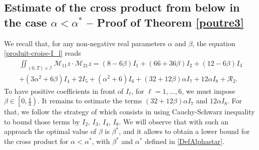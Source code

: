 \documentclass[a4paper, 12pt]{article}
\theoremstyle{plain}
\theoremstyle{definition}
\numberwithin{theorem}{section}
\numberwithin{equation}{section}
\begin{document}
{\subsection{Estimate of the cross product from below in the case \texorpdfstring{$\alpha<\alpha^*$}{etoilealpha} -- Proof of Theorem \ref{poutre3}} 
We recall that,  for any non-negative real parameters $\alpha$ and $\beta$, the equation \eqref{produit-croise-I_l} reads
\begin{multline*}
\iint_{(0,T)\times\mathcal{I}}\mathcal{M}_{11} z\cdot \mathcal{M}_{21} z=(8-6\beta)I_1+(66+36\beta) I_2+(12-6\beta) I_3\\
+(3\alpha^2+6\beta) I_4+2 I_5+(\alpha^2+6)I_6+(32+12\beta)\alpha I_7+ 12 \alpha I_8+\mathcal{R}_2.
\end{multline*}
To have positive coefficients in front of $I_\ell$, for $\ell=1,\ldots ,6$, we must impose $\beta\in \left[0,\frac{4}{3}\right)$. 
It remains to estimate the terms $(32+12\beta)\alpha I_7$ and $ 12 \alpha I_8$. For that, we follow the strategy of \cite{Sourav} which consists in using Cauchy-Schwarz inequality to bound those terms by $I_2$, $I_3$, $I_4$, $I_8$. We will observe that with such an approach the optimal value of $\beta$ is $\beta^*$, and it allows to obtain a lower bound for the cross product for $\alpha<\alpha^*$, with $\beta^*$ and $\alpha^*$ defined in \eqref{DefAlphastar}.

}
\end{document}
